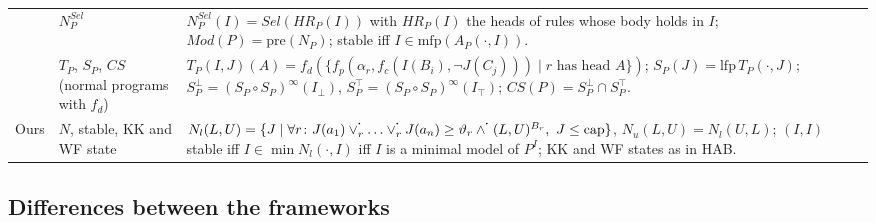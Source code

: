 {\begin{longtable}{@{}p{}p{}p{}@{}}
            \cite{PelovT04}                                                                          & $N_P^{\mathit{Sel}}$                                     & $N_P^{\mathit{Sel}}(I)=\mathit{Sel}(HR_P(I))$ with $HR_P(I)$ the heads of rules whose body holds in $I$; $\mathit{Mod}(P)=\mathrm{pre}(N_P)$; stable iff $I\in\mathrm{mfp}(A_P(\cdot,I))$.                                                                                                                                                                                                                                                                                        \\
            \cite{LoyerS02}                                                                          & $T_P$, $S_P$, $\mathit{CS}$ (normal programs with $f_d$) & $T_P(I,J)(A)=f_d(\{f_p(\alpha_r,f_c(I(B_i),\neg J(C_j)))\mid r\text{ has head }A\})$; $S_P(J)=\mathrm{lfp}\,T_P(\cdot,J)$; $S^\bot_P=(S_P\circ S_P)^\infty(I_\bot)$, $S^\top_P=(S_P\circ S_P)^\infty(I_\top)$; $\mathit{CS}(P)=S^\bot_P\cap S^\top_P$.                                                                                                                                                                                                                            \\
            Ours                                                                                     & $N$, stable, KK and WF state                             & $N_l(L,U)=\{J\mid\forall r\colon J(a_1)\mathbin{\flpcontf{\flpor_r}}\dots\mathbin{\flpcontf{\flpor_r}}J(a_n)\geq\flpweight_r\mathbin{\flpcontf{\flpand}}(L,U)^{B_r},\ J\leq\mathrm{cap}\}$, $N_u(L,U)=N_l(U,L)$; $(I,I)$ stable iff $I\in\min N_l(\cdot,I)$ iff $I$ is a minimal model of $P^I$; KK and WF states as in HAB.                                                                                                                                                      \\
        \end{longtable}
    }

\subsection*{Differences between the frameworks}

